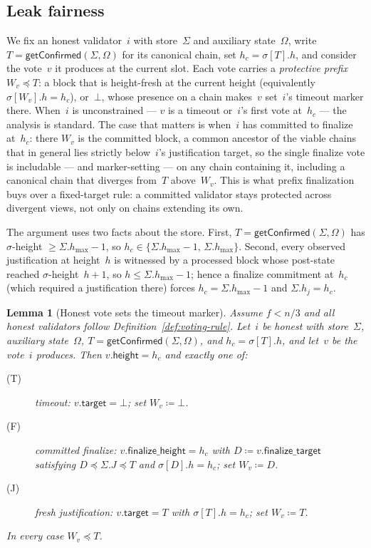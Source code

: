 \ifx\litemode\undefined\documentclass{article}\fi
\newcommand{\target}{\mathsf{target}}
\newcommand{\height}{\mathsf{height}}
\newcommand{\finalizeHeight}{\mathsf{finalize\_height}}
\newcommand{\finalizeTarget}{\mathsf{finalize\_target}}
\newcommand{\hmax}{\ensuremath{h_{\max}}\xspace}
\newcommand{\getConfirmed}{\textsf{getConfirmed}\xspace}
\theoremstyle{plain}
\newtheorem{lemma}{Lemma}
\theoremstyle{definition}
\theoremstyle{remark}
\begin{document}
\subsection{Leak fairness}

We fix an honest validator~$i$ with store~$\Sigma$ and auxiliary state~$\Omega$, write $T = \getConfirmed(\Sigma, \Omega)$ for its canonical chain, set $h_c = \sigma[T].h$, and consider the vote~$v$ it produces at the current slot.
Each vote carries a \emph{protective prefix} $W_v \preceq T$: a block that is height-fresh at the current height (equivalently $\sigma[W_v].h = h_c$), or~$\bot$, whose presence on a chain makes~$v$ set~$i$'s timeout marker there.
When~$i$ is unconstrained --- $v$ is a timeout or~$i$'s first vote at~$h_c$ --- the analysis is standard.
The case that matters is when~$i$ has committed to finalize at~$h_c$: there $W_v$ is the committed block, a common ancestor of the viable chains that in general lies strictly below~$i$'s justification target, so the single finalize vote is includable --- and marker-setting --- on any chain containing it, including a canonical chain that diverges from~$T$ above~$W_v$.
This is what prefix finalization buys over a fixed-target rule: a committed validator stays protected across divergent views, not only on chains extending its own.

The argument uses two facts about the store.
First, $T = \getConfirmed(\Sigma,\Omega)$ has $\sigma$-height $\geq \Sigma.\hmax - 1$, so $h_c \in \{\Sigma.\hmax - 1,\, \Sigma.\hmax\}$.
Second, every observed justification at height~$h$ is witnessed by a processed block whose post-state reached $\sigma$-height~$h+1$, so $h \leq \Sigma.\hmax - 1$; hence a finalize commitment at~$h_c$ (which required a justification there) forces $h_c = \Sigma.\hmax - 1$ and $\Sigma.h_j = h_c$.

\begin{lemma}[Honest vote sets the timeout marker]\label{lem:honest-vote-sets-timeout}
Assume $f < n/3$ and all honest validators follow Definition~\ref{def:voting-rule}.
Let~$i$ be honest with store~$\Sigma$, auxiliary state~$\Omega$, $T = \getConfirmed(\Sigma, \Omega)$, and $h_c = \sigma[T].h$, and let~$v$ be the vote~$i$ produces.
Then $v.\height = h_c$ and exactly one of:
\begin{description}
\item[\textnormal{(T)}] \emph{timeout:} $v.\target = \bot$; set $W_v \coloneqq \bot$.
\item[\textnormal{(F)}] \emph{committed finalize:} $v.\finalizeHeight = h_c$ with $D \coloneqq v.\finalizeTarget$ satisfying $D \preceq \Sigma.J \preceq T$ and $\sigma[D].h = h_c$; set $W_v \coloneqq D$.
\item[\textnormal{(J)}] \emph{fresh justification:} $v.\target = T$ with $\sigma[T].h = h_c$; set $W_v \coloneqq T$.
\end{description}
In every case $W_v \preceq T$.
\end{lemma}
\end{document}
